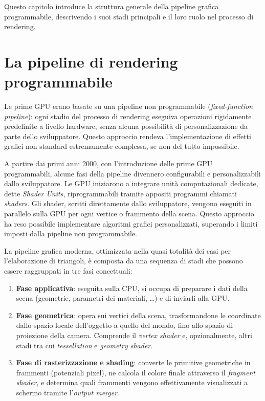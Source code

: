 \documentclass[12pt,a4paper,twoside]{book}
\begin{document}
Questo capitolo introduce la struttura generale della pipeline grafica programmabile, descrivendo i suoi stadi principali e il loro ruolo nel processo di rendering.

\section{La pipeline di rendering programmabile}
\label{sec:pipeline-overview}

Le prime GPU erano basate su una pipeline non programmabile (\textit{fixed-function pipeline}): ogni stadio del processo di rendering eseguiva operazioni rigidamente predefinite a livello hardware, senza alcuna possibilità di personalizzazione da parte dello sviluppatore. Questo approccio rendeva l'implementazione di effetti grafici non standard estremamente complessa, se non del tutto impossibile.

A partire dai primi anni 2000, con l'introduzione delle prime GPU programmabili, alcune fasi della pipeline divennero configurabili e personalizzabili dallo sviluppatore. Le GPU iniziarono a integrare unità computazionali dedicate, dette \textit{Shader Units}, riprogrammabili tramite appositi programmi chiamati \textit{shaders}. Gli shader, scritti direttamente dallo sviluppatore, vengono eseguiti in parallelo sulla GPU per ogni vertice o frammento della scena. Questo approccio ha reso possibile implementare algoritmi grafici personalizzati, superando i limiti imposti dalla pipeline non programmabile.

La pipeline grafica moderna, ottimizzata nella quasi totalità dei casi per l'elaborazione di triangoli, è composta da una sequenza di stadi che possono essere raggruppati in tre fasi concettuali:

\begin{enumerate}
    \item \textbf{Fase applicativa}: eseguita sulla CPU, si occupa di preparare i dati della scena (geometrie, parametri dei materiali, \ldots) e di inviarli alla GPU.
    \item \textbf{Fase geometrica}: opera sui vertici della scena, trasformandone le coordinate dallo spazio locale dell'oggetto a quello del mondo, fino allo spazio di proiezione della camera. Comprende il \textit{vertex shader} e, opzionalmente, altri stadi tra cui \textit{tessellation} e \textit{geometry shader}.
    \item \textbf{Fase di rasterizzazione e shading}: converte le primitive geometriche in frammenti (potenziali pixel), ne calcola il colore finale attraverso il \textit{fragment shader}, e determina quali frammenti vengono effettivamente visualizzati a schermo tramite l'\textit{output merger}.
\end{enumerate}
\end{document}

